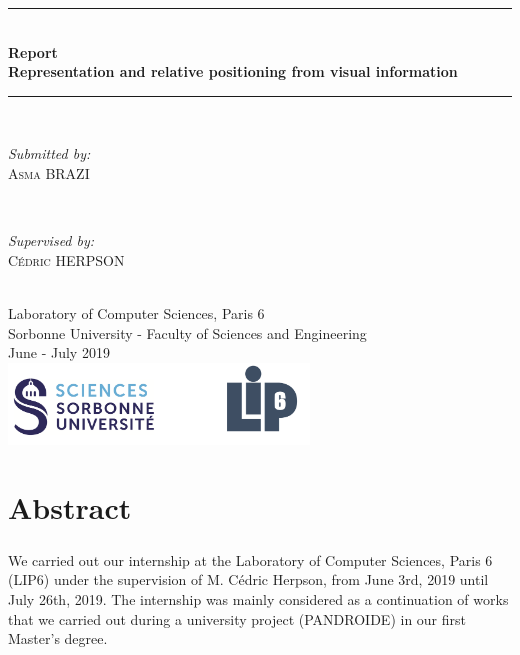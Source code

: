 \documentclass[12pt]{report}
\begin{document}
	\begin{titlepage}
		
		\newcommand{\HRule}{\rule{\linewidth}{0.5mm}} %
		
		\center 
		\HRule \\[0.4cm]
		{ \huge \bfseries Report \\Representation and relative positioning from visual information}\\[0.4cm]
		\HRule \\[1.5cm]
		
		\begin{minipage}{0.4\textwidth}
			\begin{flushleft} \large
				\emph{Submitted by:}\\
				\textsc{Asma BRAZI}
			\end{flushleft}
		\end{minipage}
		~
		\begin{minipage}{0.4\textwidth}
			\begin{flushright} \large
				\emph{Supervised by:} \\
				\textsc{Cédric HERPSON}\\
			\end{flushright}
		\end{minipage}\\[4cm]
		
		
		{\large Laboratory of Computer Sciences, Paris 6 \\ Sorbonne University - Faculty of Sciences and Engineering}\\[3cm] 
		{\large June - July 2019 }\\[3cm] 
		\includegraphics[width=0.6\textwidth]{res/logo.png}\\[1cm] 
		\vfill %
		
	\end{titlepage}
	

	\chapter{Abstract}
	
	\paragraph{}
	We carried out our internship at the Laboratory of Computer Sciences, Paris 6 (LIP6) under the supervision of M. Cédric Herpson, from June 3rd, 2019 until July 26th, 2019. The internship was mainly considered as a continuation of works that we carried out during a university project (PANDROIDE) in our first Master's degree. 
	
\end{document}
